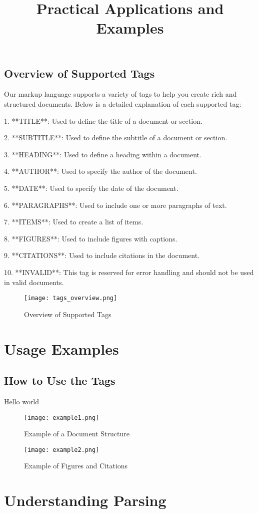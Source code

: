 \documentclass[oneside]{memoir}
\begin{document}
\section{Overview of Supported Tags}
Our markup language supports a variety of tags to help you create rich and structured documents. Below is a detailed explanation of each supported tag:\par
1. **TITLE**: Used to define the title of a document or section.\par
2. **SUBTITLE**: Used to define the subtitle of a document or section.\par
3. **HEADING**: Used to define a heading within a document.\par
4. **AUTHOR**: Used to specify the author of the document.\par
5. **DATE**: Used to specify the date of the document.\par
6. **PARAGRAPHS**: Used to include one or more paragraphs of text.\par
7. **ITEMS**: Used to create a list of items.\par
8. **FIGURES**: Used to include figures with captions.\par
9. **CITATIONS**: Used to include citations in the document.\par
10. **INVALID**: This tag is reserved for error handling and should not be used in valid documents.\par
\begin{figure}
\centering
\texttt{[image: tags\_overview.png]}
\caption{Overview of Supported Tags}
\end{figure}

\newpage
\chapter{Usage Examples}
\section{How to Use the Tags}
\title{Practical Applications and Examples}
Hello world\par
\begin{figure}
\centering
\texttt{[image: example1.png]}
\caption{Example of a Document Structure}
\centering
\texttt{[image: example2.png]}
\caption{Example of Figures and Citations}
\end{figure}

\newpage
\chapter{Understanding Parsing}
\end{document}
